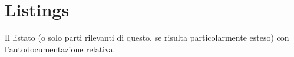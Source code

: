 \chapter{Listings}
\label{appendixC}
\thispagestyle{empty}

\noindent Il listato (o solo parti rilevanti di questo, se risulta particolarmente esteso) con l'autodocumentazione relativa.